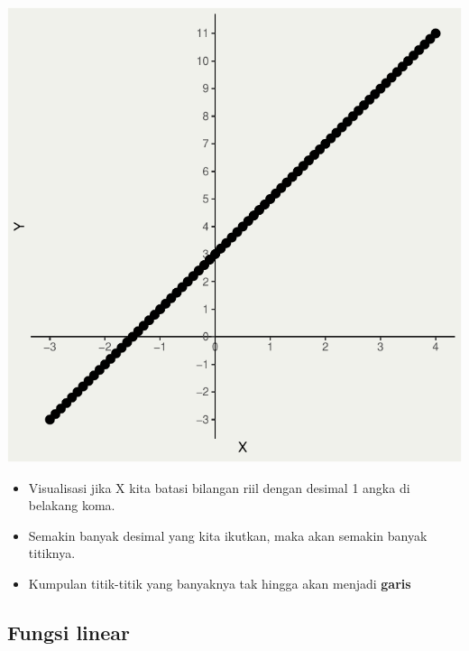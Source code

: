 \documentclass[
  letterpaper,
  DIV=11,
  numbers=noendperiod]{scrartcl}
\begin{document}
\includegraphics{index_files/figure-pdf/unnamed-chunk-3-1.pdf}

\begin{itemize}
\item
  Visualisasi jika X kita batasi bilangan riil dengan desimal 1 angka di
  belakang koma.
\item
  Semakin banyak desimal yang kita ikutkan, maka akan semakin banyak
  titiknya.
\item
  Kumpulan titik-titik yang banyaknya tak hingga akan menjadi
  \textbf{garis}
\end{itemize}

\subsection{Fungsi linear}\label{fungsi-linear}
\end{document}
